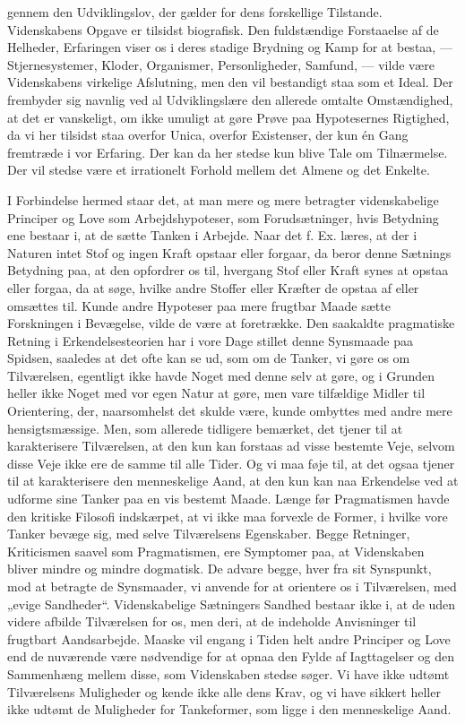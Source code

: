\documentclass[12pt,a4paper]{article}
\newcommand{\opage}[1]{\marginnote{\footnotesize\textit{[#1]}}}
\begin{document}
gennem den Udviklingslov, der gælder for dens forskellige Tilstande.
Videnskabens Opgave er tilsidst biografisk. Den fuldstændige Forstaaelse af de
Helheder, Erfaringen viser os i deres stadige Brydning og Kamp for at bestaa,
--- Stjernesystemer, Kloder, Organismer, Personligheder, Samfund, --- vilde være
Videnskabens virkelige Afslutning, men den vil bestandigt staa som et Ideal. Der
frembyder sig navnlig ved al Udviklingslære den allerede omtalte Omstændighed,
at det er vanskeligt, om ikke umuligt at gøre Prøve paa \opage{43} Hypotesernes Rigtighed,
da vi her tilsidst staa overfor Unica, overfor Existenser, der kun én Gang
fremtræde i vor Erfaring. Der kan da her stedse kun blive Tale om Tilnærmelse.
Der vil stedse være et irrationelt Forhold mellem det Almene og det Enkelte.

I Forbindelse hermed staar det, at man mere og mere betragter videnskabelige
Principer og Love som Arbejdshypoteser, som Forudsætninger, hvis Betydning ene
bestaar i, at de sætte Tanken i Arbejde. Naar det f. Ex. læres, at der i Naturen
intet Stof og ingen Kraft opstaar eller forgaar, da beror denne Sætnings
Betydning paa, at den opfordrer os til, hvergang Stof eller Kraft synes at
opstaa eller forgaa, da at søge, hvilke andre Stoffer eller Kræfter de opstaa af
eller omsættes til. Kunde andre Hypoteser paa mere frugtbar Maade sætte
Forskningen i Bevægelse, vilde de være at foretrække. Den saakaldte pragmatiske
Retning i Erkendelsesteorien har i vore Dage stillet denne Synsmaade paa
Spidsen, saaledes at det ofte kan se ud, som om de Tanker, vi gøre os om
Tilværelsen, egentligt ikke havde Noget med denne selv at gøre, og i Grunden
heller ikke Noget med vor egen Natur at gøre, men vare tilfældige Midler til
Orientering, der, naarsomhelst det skulde være, kunde ombyttes med andre mere
hensigtsmæssige. Men, som allerede tidligere bemærket, det tjener til at
karakterisere Tilværelsen, at den kun kan forstaas ad visse bestemte Veje,
selvom disse Veje ikke ere de samme til alle Tider. Og vi maa føje til, at det
ogsaa tjener til at karakterisere den menneskelige Aand, at den kun kan naa
Erkendelse ved at udforme sine Tanker paa en vis bestemt Maade. Længe før
Pragmatismen havde den kritiske Filosofi indskærpet, at vi ikke maa forvexle de
Former, i hvilke vore Tanker bevæge sig, med selve Tilværelsens Egenskaber.
Begge Retninger, Kriticismen saavel som Pragmatismen, ere Symptomer paa, at
Videnskaben bliver mindre og mindre dogmatisk. De advare begge, hver fra \opage{44} sit
Synspunkt, mod at betragte de Synsmaader, vi anvende for at orientere os i
Tilværelsen, med „evige Sandheder“. Videnskabelige Sætningers Sandhed bestaar
ikke i, at de uden videre afbilde Tilværelsen for os, men deri, at de indeholde
Anvisninger til frugtbart Aandsarbejde. Maaske vil engang i Tiden helt andre
Principer og Love end de nuværende være nødvendige for at opnaa den Fylde af
Iagttagelser og den Sammenhæng mellem disse, som Videnskaben stedse søger. Vi
have ikke udtømt Tilværelsens Muligheder og kende ikke alle dens Krav, og vi
have sikkert heller ikke udtømt de Muligheder for Tankeformer, som ligge i den
menneskelige Aand.
\end{document}
